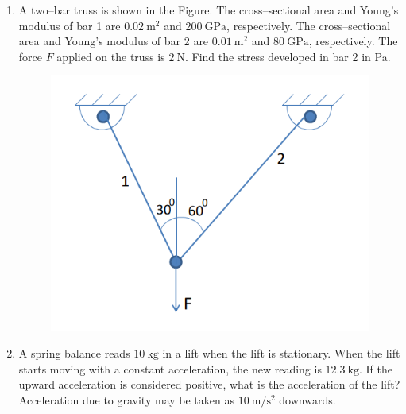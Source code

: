 \documentclass[journal,12pt,onecolumn]{IEEEtran}
\theoremstyle{remark}
\begin{document}
\begin{enumerate}
\begin{multicols}{4}
\begin{enumerate}
\item $\sqrt{\frac{k L^2}{Ma^2}}$
\item $\sqrt{\frac{ka}{Ml}}$
\item $\sqrt{\frac{ka^2}{ML^2}}$
\item $\sqrt{\frac{kL}{Ma}}$
\end{enumerate}
\end{multicols}

\item A two–bar truss is shown in the Figure. The cross–sectional area and Young’s modulus of bar 1 are $0.02 \ \mathrm{m^2}$ and $200 \ \mathrm{GPa}$, respectively. The cross–sectional area and Young’s modulus of bar 2 are $0.01 \ \mathrm{m^2}$ and $80 \ \mathrm{GPa}$, respectively. The force $F$ applied on the truss is $2 \ \mathrm{N}$. Find the stress developed in bar 2 in Pa. \underline{\hspace{2cm}}
\begin{figure}[H]
    \centering
    \includegraphics[width=0.5\columnwidth]{figs/fig12.png}
    \caption{}
    \label{fig:fig12}
\end{figure}
\item A spring balance reads $10 \ \mathrm{kg}$ in a lift when the lift is stationary. When the lift starts moving with a constant acceleration, the new reading is $12.3 \ \mathrm{kg}$. If the upward acceleration is considered positive, what is the acceleration of the lift? Acceleration due to gravity may be taken as $10 \ \mathrm{m/s^2}$ downwards. \underline{\hspace{2cm}}


\end{enumerate}
\end{document}
